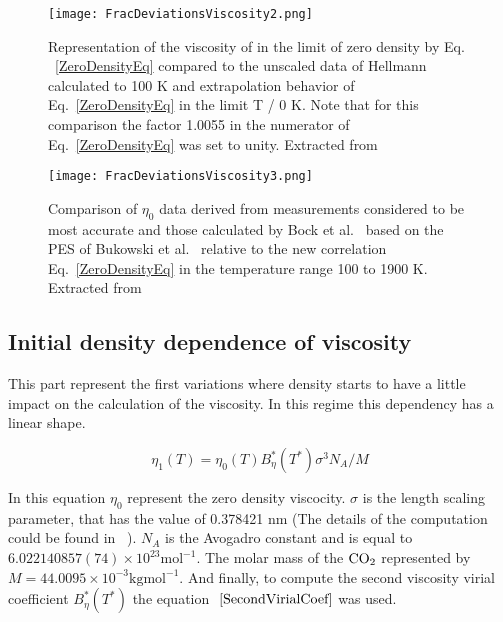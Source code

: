 \begin{figure}[h!]
	\centering
	\texttt{[image: FracDeviationsViscosity2.png]}
	\caption{Representation of the viscosity of  in the limit of zero
	density by Eq. ~\ref{ZeroDensityEq} compared to the unscaled data of
	Hellmann~\cite{hellmann2014ab} calculated to 100 K and extrapolation behavior of
	Eq.~\ref{ZeroDensityEq} in the limit T / 0 K. Note that for this comparison
	the factor 1.0055 in the numerator of Eq.~\ref{ZeroDensityEq} was set to
	unity. Extracted from \cite{laesecke2017reference}}
\label{fig:FracDeviationsViscosity2}
\end{figure}

\begin{figure}[h!]
	\centering
	\texttt{[image: FracDeviationsViscosity3.png]}
	\caption{Comparison of $\eta_0$ data derived from measurements considered to
	be most accurate and those calculated by Bock et
	al.~\cite{bock2002calculation} based on the PES of Bukowski et
	al.~\cite{bukowski1999intermolecular} relative to the new correlation
	Eq.~\ref{ZeroDensityEq} in the temperature range 100 to 1900 K. Extracted
	from \cite{huber2016reference}}
\label{fig:FracDeviationsViscosity3}
\end{figure}


\subsection{Initial density dependence of viscosity}

This part represent the first variations where density starts to have a little
impact on the calculation of the viscosity. In this regime this dependency
has a linear shape.

\begin{equation}
    \eta_1(T) = \eta_0(T)B^*_\eta(T^*)\sigma^3N_A/M 
	\label{InitialDensityViscoEq}
\end{equation}

In this equation $\eta_0$ represent the zero density viscocity. $\sigma$ is the
length scaling parameter, that has the value of 0.378421 nm (The details of the
computation could be found in ~\cite{laesecke2017reference}). $N_A$ is the
Avogadro constant and is equal to $6.022140857(74)\times 10^{23}
\mathrm{mol}^{-1}$. The molar mass of the $\ce{CO2}$ represented by $M = 44.0095
\times 10^{-3} \mathrm{kg mol^{-1}}$. And finally, to compute the second
viscosity virial coefficient $B^*_\eta(T^*)$ the equation
$~\ref{SecondVirialCoef}$ was used.  

